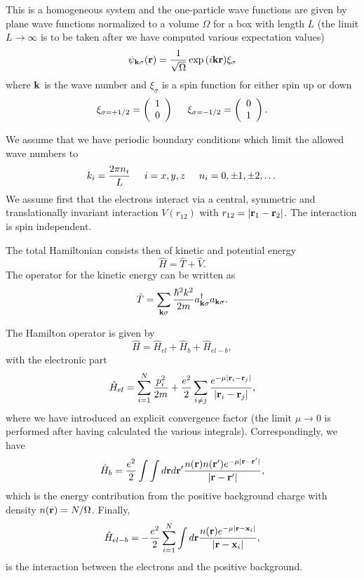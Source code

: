 This is a homogeneous system and the one-particle wave functions are given by plane wave functions normalized to a volume $\Omega$ 
for a box with length $L$ (the limit $L\rightarrow \infty$ is to be taken after we have computed various expectation values)
\[
\psi_{{\bf k}\sigma}({\bf r})= \frac{1}{\sqrt{\Omega}}\exp{(i{\bf kr})}\xi_{\sigma}
\]
where ${\bf k}$ is the wave number and  $\xi_{\sigma}$ is a spin function for either spin up or down
\[ 
\xi_{\sigma=+1/2}=\left(\begin{array}{c} 1 \\ 0 \end{array}\right) \hspace{0.5cm}
\xi_{\sigma=-1/2}=\left(\begin{array}{c} 0 \\ 1 \end{array}\right).\]

We assume that we have periodic boundary conditions which limit the allowed wave numbers to
\[
k_i=\frac{2\pi n_i}{L}\hspace{0.5cm} i=x,y,z \hspace{0.5cm} n_i=0,\pm 1,\pm 2, \dots
\]
We assume first that the electrons interact via a central, symmetric and translationally invariant
interaction  $V(r_{12})$ with
$r_{12}=|{\bf r}_1-{\bf r}_2|$.  The interaction is spin independent.

The total Hamiltonian consists then of kinetic and potential energy
\[
\hat{H} = \hat{T}+\hat{V}.
\]
The operator for the kinetic energy can be written as
\[
\hat{T}=\sum_{{\bf k}\sigma}\frac{\hbar^2k^2}{2m}a_{{\bf k}\sigma}^{\dagger}a_{{\bf k}\sigma}.
\]

The Hamilton operator is given by
\[
\hat{H}=\hat{H}_{el}+\hat{H}_{b}+\hat{H}_{el-b},
\]
with the electronic part
\[
\hat{H}_{el}=\sum_{i=1}^N\frac{p_i^2}{2m}+\frac{e^2}{2}\sum_{i\ne j}\frac{e^{-\mu |{\bf r}_i-{\bf r}_j|}}{|{\bf r}_i-{\bf r}_j|},
\]
where we have introduced an explicit convergence factor
(the limit $\mu\rightarrow 0$ is performed after having calculated the various integrals).
Correspondingly, we have
\[
\hat{H}_{b}=\frac{e^2}{2}\int\int d{\bf r}d{\bf r}'\frac{n({\bf r})n({\bf r}')e^{-\mu |{\bf r}-{\bf r}'|}}{|{\bf r}-{\bf r}'|},
\]
which is the energy contribution from the positive background charge with density
$n({\bf r})=N/\Omega$. Finally,
\[
\hat{H}_{el-b}=-\frac{e^2}{2}\sum_{i=1}^N\int d{\bf r}\frac{n({\bf r})e^{-\mu |{\bf r}-{\bf x}_i|}}{|{\bf r}-{\bf x}_i|},
\]
is the interaction between the electrons and the positive background.

